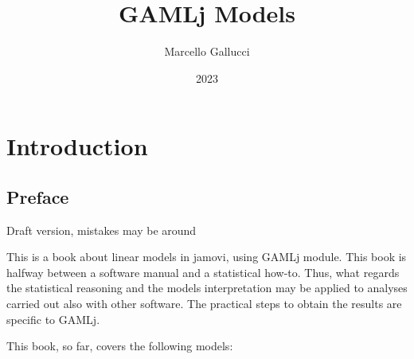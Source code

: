 \documentclass[
]{book}
\title{GAMLj Models}
\author{Marcello Gallucci}
\date{2023}
\begin{document}
\maketitle

{
\setcounter{tocdepth}{1}
\tableofcontents
}
\hypertarget{booklet}{%
\chapter{Introduction}\label{booklet}}

\hypertarget{preface}{%
\section{Preface}\label{preface}}

{ Draft version, mistakes may be around }

This is a book about linear models in {jamovi}, using {GAMLj} module. This book is halfway between a software manual and a statistical how-to. Thus, what regards the statistical reasoning and the models interpretation may be applied to analyses carried out also with other software. The practical steps to obtain the results are specific to {GAMLj}.

This book, so far, covers the following models:
\end{document}
